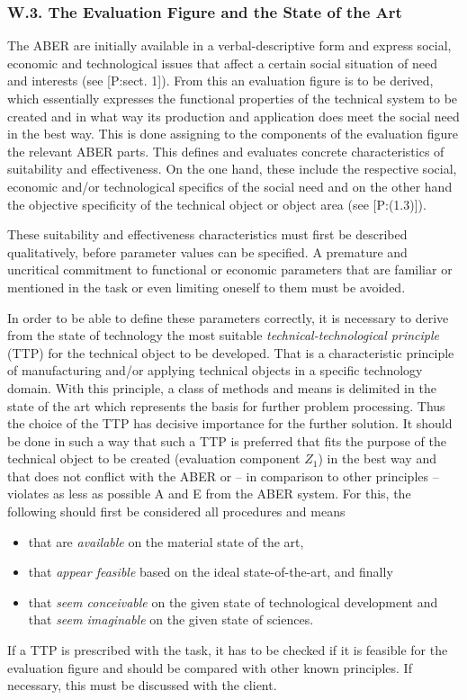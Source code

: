 \documentclass[11pt,a4paper]{article}
\begin{document}
\subsubsection*{W.3. The Evaluation Figure and the State of the Art}

The ABER are initially available in a verbal-descriptive form and express
social, economic and technological issues that affect a certain social
situation of need and interests (see [P:sect. 1]). From this an evaluation
figure is to be derived, which essentially expresses the functional properties
of the technical system to be created and in what way its production and
application does meet the social need in the best way. This is done assigning
to the components of the evaluation figure the relevant ABER parts. This
defines and evaluates concrete characteristics of suitability and
effectiveness. On the one hand, these include the respective social, economic
and/or technological specifics of the social need and on the other hand the
objective specificity of the technical object or object area (see [P:(1.3)]).

These suitability and effectiveness characteristics must first be described
qualitatively, before parameter values can be specified. A premature and
uncritical commitment to functional or economic parameters that are familiar
or mentioned in the task or even limiting oneself to them must be avoided.

In order to be able to define these parameters correctly, it is necessary to
derive from the state of technology the most suitable
\emph{technical-technological principle} (TTP) for the technical object to be
developed. That is a characteristic principle of manufacturing and/or applying
technical objects in a specific technology domain. With this principle, a
class of methods and means is delimited in the state of the art which
represents the basis for further problem processing. Thus the choice of the
TTP has decisive importance for the further solution. It should be done in
such a way that such a TTP is preferred that fits the purpose of the technical
object to be created (evaluation component $Z_1$) in the best way and that
does not conflict with the ABER or -- in comparison to other principles --
violates as less as possible A and E from the ABER system. For this, the
following should first be considered all procedures and means
\begin{itemize}
\item that are \emph{available} on the material state of the art,
\item that \emph{appear feasible} based on the ideal state-of-the-art, and
  finally
\item that \emph{seem conceivable} on the given state of technological
  development and that \emph{seem imaginable} on the given state of sciences.
\end{itemize}
If a TTP is prescribed with the task, it has to be checked if it is feasible
for the evaluation figure and should be compared with other known principles.
If necessary, this must be discussed with the client.
\end{document}
